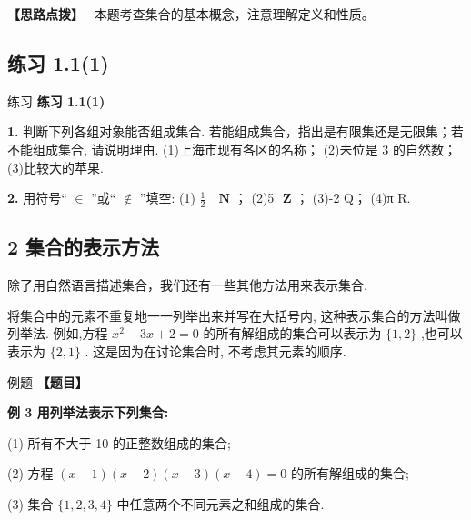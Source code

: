 \documentclass[a4paper,10pt,oneside,fontset=none]{ctexbook}
\newcommand{\fillin}[1][2cm]{\,\underline{\hspace{#1}}\,}
\newcounter{example}[chapter]
\newenvironment{example}[1][]{\begin{exBox}{例题}{#1}}{\end{exBox}}
\newenvironment{exercise}[1][]{\begin{exBox}{练习}{#1}}{\end{exBox}}
\numberwithin{equation}{chapter}
\newenvironment{hint}{\begin{hintBox}\textbf{【思路点拨】}~}{\end{hintBox}}
\begin{document}
\begin{hint}
本题考查集合的基本概念，注意理解定义和性质。
\end{hint}

\subsection*{练习 1.1(1)}

\begin{exercise}
\textbf{练习 1.1(1)}\par\vspace{0.5em}
\textbf{1.} 判断下列各组对象能否组成集合. 若能组成集合，指出是有限集还是无限集；若不能组成集合, 请说明理由. (1)上海市现有各区的名称； (2)未位是 3 的自然数； (3)比较大的苹果.
\par\vspace{0.8em}
\textbf{2.} 用符号“ $\in$ ”或“ $\notin$ ”填空: (1) $\frac{1}{2}$ \fillin[2cm] $\mathbf{N}$ ； (2)5\fillin[2cm] $\mathbf{Z}$ ； (3)-2\fillin[2cm]Q； (4)π\fillin[2cm]R.
\end{exercise}

\subsection{2 集合的表示方法}

除了用自然语言描述集合，我们还有一些其他方法用来表示集合.

将集合中的元素不重复地一一列举出来并写在大括号内, 这种表示集合的方法叫做列举法. 例如,方程 ${x}^{2} - {3x} + 2 = 0$ 的所有解组成的集合可以表示为 $\{ 1,2\}$ ,也可以表示为 $\{ 2,1\}$ . 这是因为在讨论集合时, 不考虑其元素的顺序.

\begin{example}
\textbf{【题目】}\par\vspace{0.3em}
\textbf{例 3 用列举法表示下列集合:}\par\vspace{0.3em}
\par
(1) 所有不大于 10 的正整数组成的集合;
\par
(2) 方程 $\left( {x - 1}\right) \left( {x - 2}\right) \left( {x - 3}\right) \left( {x - 4}\right)  = 0$ 的所有解组成的集合;
\par
(3) 集合 $\{ 1,2,3,4\}$ 中任意两个不同元素之和组成的集合.
\end{example}
\end{document}
